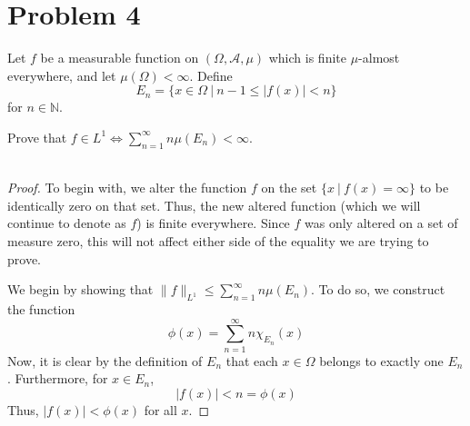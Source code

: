 \documentclass[fontsize=11pt]{scrartcl} %
\numberwithin{equation}{section} %
\numberwithin{figure}{section} %
\numberwithin{table}{section} %
\newcommand{\N}{\mathbb{N}}
\begin{document}
\newpage

\section*{Problem 4}
Let $f$ be a measurable function on $(\Omega,\mathscr{A},\mu)$ which is finite
$\mu$-almost everywhere, and let $\mu(\Omega)<\infty$. Define
\[
    E_n = \{x\in\Omega\ |\ n-1\leq |f(x)|< n\}
\]
for $n\in\N$.

Prove that $f\in L^1 \iff \sum_{n=1}^{\infty}n\mu(E_n)<\infty$.
\\
\\
\begin{proof}
    To begin with, we alter the function $f$ on the set $\{x\ |\ f(x)=\infty\}$
    to be identically zero on that set. Thus, the new altered function (which we
    will continue to denote as $f$) is finite everywhere. Since $f$ was only
    altered on a set of measure zero, this will not affect either side of the
    equality we are trying to prove.

    We begin by showing that $\|f\|_{L^1}\leq \sum_{n=1}^{\infty}n\mu(E_n)$.
    To do so, we construct the function
    \[
        \phi(x) = \sum_{n=1}^{\infty}n\chi_{E_n}(x)
    \]
    Now, it is clear by the definition of $E_n$ that each $x\in\Omega$ belongs to
    exactly one $E_n$. Furthermore, for $x\in E_n$,
    \[
        |f(x)| < n = \phi(x)
    \]
    Thus, $|f(x)| < \phi(x)$ for all $x$.


\end{proof}
\end{document}
